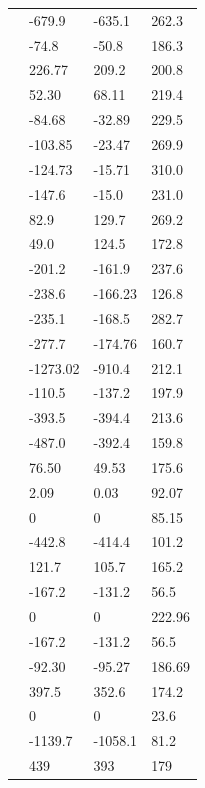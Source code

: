 \begin{supertabular}{llll}
     & -679.9 & -635.1 & 262.3 \\
     & -74.8 & -50.8 & 186.3 \\
     & 226.77 & 209.2 & 200.8 \\
     & 52.30 & 68.11 & 219.4 \\
     & -84.68 & -32.89 & 229.5 \\
     & -103.85 & -23.47 & 269.9 \\
     & -124.73 & -15.71 & 310.0 \\
     & -147.6 & -15.0 & 231.0 \\
     & 82.9 & 129.7 & 269.2 \\
     & 49.0 & 124.5 & 172.8 \\
     & -201.2 & -161.9 & 237.6 \\
     & -238.6 & -166.23 & 126.8 \\
     & -235.1 & -168.5 & 282.7 \\
     & -277.7 & -174.76 & 160.7 \\
     & -1273.02 & -910.4 & 212.1 \\
     & -110.5 & -137.2 & 197.9 \\
     & -393.5 & -394.4 & 213.6 \\
     & -487.0 & -392.4 & 159.8 \\
     & 76.50 & 49.53 & 175.6 \\
     & 2.09 & 0.03 & 92.07 \\
     & 0 & 0 & 85.15 \\
     & -442.8 & -414.4 & 101.2 \\
     & 121.7 & 105.7 & 165.2 \\
     & -167.2 & -131.2 & 56.5 \\
     & 0 & 0 & 222.96 \\
     & -167.2 & -131.2 & 56.5 \\
     & -92.30 & -95.27 & 186.69 \\
     & 397.5 & 352.6 & 174.2 \\
     & 0 & 0 & 23.6 \\
     & -1139.7 & -1058.1 & 81.2 \\
     & 439 & 393 & 179 \\

\end{supertabular}
